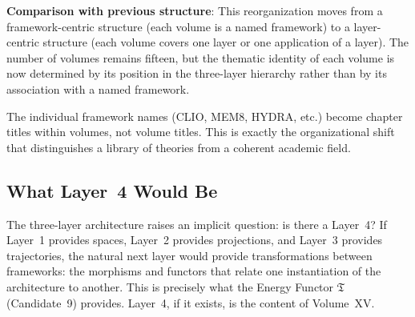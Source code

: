 \documentclass[11pt, a4paper]{article}
\begin{document}
\medskip
\begin{notebox}
\textbf{Comparison with previous structure}: This reorganization
moves from a framework-centric structure (each volume is a named
framework) to a layer-centric structure (each volume covers one
layer or one application of a layer). The number of volumes remains
fifteen, but the thematic identity of each volume is now determined
by its position in the three-layer hierarchy rather than by its
association with a named framework.

The individual framework names (CLIO, MEM\textbar{}8, HYDRA, etc.)
become chapter titles within volumes, not volume titles. This is
exactly the organizational shift that distinguishes a library of
theories from a coherent academic field.
\end{notebox}

\subsection{What Layer~4 Would Be}

The three-layer architecture raises an implicit question: is there a
Layer~4? If Layer~1 provides spaces, Layer~2 provides projections, and
Layer~3 provides trajectories, the natural next layer would provide
transformations between frameworks: the morphisms and functors that
relate one instantiation of the architecture to another. This is
precisely what the Energy Functor $\mathfrak{T}$ (Candidate~9) provides.
Layer~4, if it exists, is the content of Volume~XV.
\end{document}
